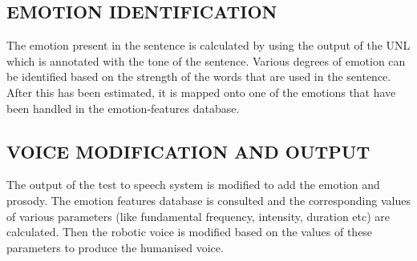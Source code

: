 \documentclass{article}
\begin{document}
\subsection{EMOTION IDENTIFICATION }
The emotion present in the sentence is calculated by using the output of the UNL which is annotated with the tone of the sentence. Various degrees of emotion can be identified based on the strength of the words that are used in the sentence. After this has been estimated, it is mapped onto one of the emotions that have been handled in the emotion-features database.

\subsection{VOICE MODIFICATION AND OUTPUT}
The output of the test to speech system is modified to add the emotion and prosody. The emotion features database is consulted and the corresponding values of various parameters (like fundamental frequency, intensity, duration etc) are calculated. Then the robotic voice is modified based on the values of these parameters to produce the humanised voice. 
\end{document}
